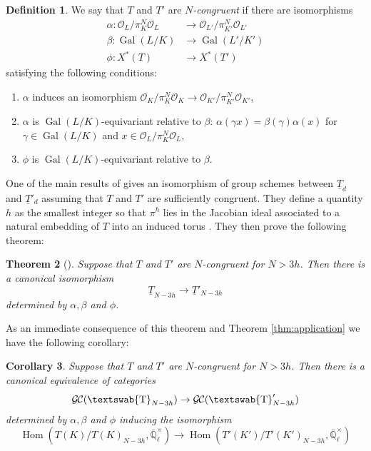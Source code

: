 \documentclass[11pt]{amsart}
\newcommand{\mathswab}[1]{\operatorname{\textswab{#1}}}
\theoremstyle{plain}
\newtheorem{theorem}{Theorem}[section]
\newtheorem{corollary}[theorem]{Corollary}
\theoremstyle{definition}
\newtheorem{definition}[theorem]{Definition}
\theoremstyle{remark}
\newcommand{\EE}{\mathbb{\bar Q}_\ell}
\newcommand{\OK}{\mathcal{O}_K}
\newcommand{\OL}{\mathcal{O}_L}
\newcommand{\OO}[1]{\mathcal{O}_{#1}}
\newcommand{\EEx}{\EE^\times}
\DeclareMathOperator{\Gal}{Gal}
\DeclareMathOperator{\Hom}{Hom}
\newcommand{\GN}[1]{\mathswab{#1}}
\newcommand{\TT}{\underline{T}}
\newcommand{\GC}{{\mathcal{G\hskip-0.8pt C}}}
\begin{document}
\begin{definition}
 We say that $T$ and $T'$ are \emph{$N$-congruent} if there are isomorphisms
 \begin{align*}
  \alpha : \OL/\pi_K^N \OL &\to \OO{L'}/\pi_{K'}^N \OO{L'} \\
  \beta : \Gal(L/K) &\to \Gal(L'/K') \\
  \phi : X^*(T) &\to X^*(T')
 \end{align*}
 satisfying the following conditions:
 \begin{enumerate}
  \item $\alpha$ induces an isomorphism $\OK/\pi_K^N \OK \to \OO{K'}/\pi_{K'}^N \OO{K'}$,
  \item $\alpha$ is $\Gal(L/K)$-equivariant relative to $\beta$: $\alpha(\gamma x) = \beta(\gamma) \alpha(x)$
  for $\gamma \in \Gal(L/K)$ and $x \in \OL/\pi_K^N \OL$,
  \item $\phi$ is $\Gal(L/K)$-equivariant relative to $\beta$.
 \end{enumerate}
\end{definition}

One of the main results of \cite{CY} gives an isomorphism of group schemes between
$\TT_d$ and $\TT'_d$ assuming that $T$ and $T'$ are sufficiently congruent.
They define a quantity $h$ as the smallest integer so that $\pi^h$ lies in the
Jacobian ideal associated to a natural embedding of $T$ into an induced torus \cite[\S 8.1]{CY}.
They then prove the following theorem:

\begin{theorem}[{\cite[Thm. 8.5]{CY}}]
 Suppose that $T$ and $T'$ are $N$-congruent for $N > 3h$.  Then there is a canonical isomorphism
 \[
  \TT_{N-3h} \to \TT'_{N-3h}
 \]
 determined by $\alpha, \beta$ and $\phi$.
\end{theorem}

As an immediate consequence of this theorem and Theorem \ref{thm:application} we have the following corollary:

\begin{corollary}
 Suppose that $T$ and $T'$ are $N$-congruent for $N > 3h$.  Then there is a canonical equivalence of categories
 \[
  \GC(\GN{T}_{N-3h}) \to \GC(\GN{T}'_{N-3h})
 \]
 determined by $\alpha, \beta$ and $\phi$ inducing the isomorphism
 \[
  \Hom(T(K) / T(K)_{N-3h}, \EEx) \to \Hom(T'(K') / T'(K')_{N-3h}, \EEx)
 \]
\end{corollary}

\end{document}
